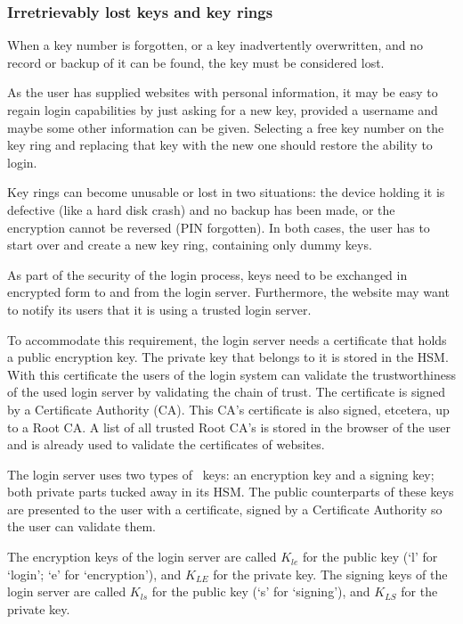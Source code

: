 \subsubsection{Irretrievably lost keys and key rings}
When a key number is forgotten,
or a key inadvertently overwritten,
and no record or backup of it can be found,
the key must be considered lost.
\par
As the user has supplied websites with personal information,
it may be easy to regain login capabilities by just asking for a new key,
provided a username and maybe some other information can be given.
Selecting a free key number on the key ring and replacing that key with the new one should restore the ability to login.
\par
Key rings can become unusable or lost in two situations:
the device holding it is defective
(like a hard disk crash)
and no backup has been made,
or the encryption cannot be reversed
(PIN forgotten).
In both cases,
the user has to start over and create a new key ring,
containing only dummy keys.

As part of the security of the login process,
keys need to be exchanged in encrypted form to and from the login server.
Furthermore,
the website may want to notify its users that it is using a trusted login server.
\par
To accommodate this requirement, the login server needs a certificate that holds a public encryption key.
The private key that belongs to it is stored in the HSM.
With this certificate the users of the login system can validate the trustworthiness of the used login server
by validating the chain of trust.
The certificate is signed by a Certificate Authority (CA).
This CA's certificate is also signed, etcetera, up to a Root CA.
A list of all trusted Root CA's is stored in the browser of the user
and is already used to validate the certificates of websites.
\par
The login server uses two types of \RSA\ keys:
an encryption key and a signing key; both private parts tucked away in its HSM.
The public counterparts of these keys are presented to the user with a certificate,
signed by a Certificate Authority so the user can validate them.
\par
The encryption keys of the login server are called $K_{le}$ for the public key
(`l' for `login'; `e' for `encryption'),
and $K_{LE}$ for the private key.
The signing keys of the login server are called $K_{ls}$ for the public key
(`s' for `signing'),
and $K_{LS}$ for the private key.
